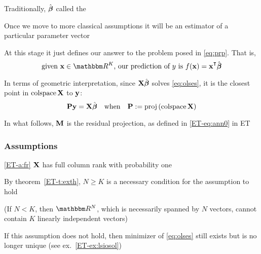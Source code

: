 \begin{frame}
    
    \vspace{2em}
    Traditionally, $\hat {\boldsymbol \beta}$ called the 
    
    Once we move to more classical assumptions it 
    will be an estimator of a particular parameter vector
    
    \vspace{.7em}
    At this stage it just
    defines our answer to the problem posed in \eqref{eq:prp}.  That is,
    \begin{equation*}
        \text{given $\boldx \in \RR^K$, our prediction of $y$ is }
        f(\boldx) = \boldx^\T \hboldbeta
    \end{equation*}
    
\end{frame}

\begin{frame}
    
    \vspace{2em}
    In terms of geometric interpretation, since $\mathbf X \hat {\boldsymbol \beta}$ solves
    \eqref{eq:olses}, it is the closest point in $\operatorname{colspace} \mathbf X$
    to ${\mathbf y}$:
    \begin{equation*}
        \mathbf P {\mathbf y} = \mathbf X \hat {\boldsymbol \beta}   
        \quad \text{when} \quad
        \mathbf P := \operatorname{proj} \, (\operatorname{colspace} \mathbf X )
    \end{equation*}
    
    \vspace{.7em}
    In what follows,
    $\mathbf M$ is the residual projection, as defined in \eqref{ET-eq:ann0} in ET

\end{frame}

\begin{frame}\frametitle{Assumptions}
 
    \vspace{2em}
    \Ass\eqref{ET-a:fr} 
    $\mathbf X$ has full column rank with probability one
      
    By theorem~\ref{ET-t:exth}, $N \geq K$ is a necessary
    condition for the assumption to hold
    
    (If $N < K$, then $\RR^N$, which
    is necessarily spanned by $N$ vectors, cannot contain $K$ linearly
    independent vectors)
    
    \vspace{.7em}
    If this assumption does not hold, then minimizer of \eqref{eq:olses} still exists
    but is no longer unique (see ex.~\ref{ET-ex:lsiosol})  
    
\end{frame}


